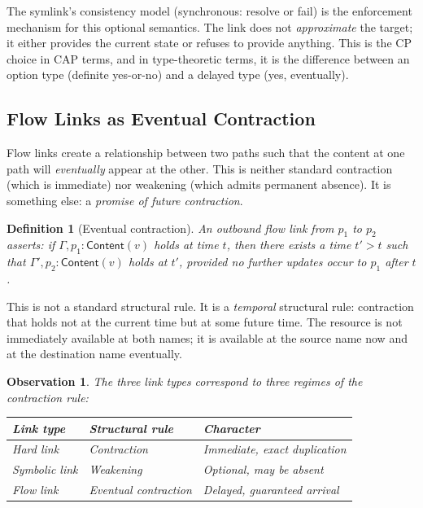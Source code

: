\documentclass[11pt]{article}
\newtheorem{definition}{Definition}
\newtheorem{observation}{Observation}
\newcommand{\tp}[1]{\mathsf{#1}}
\begin{document}
The symlink's consistency model (synchronous: resolve or fail) is the
enforcement mechanism for this optional semantics. The link does not
\emph{approximate} the target; it either provides the current state or refuses
to provide anything. This is the CP choice in CAP terms, and in type-theoretic
terms, it is the difference between an option type (definite yes-or-no) and a
delayed type (yes, eventually).

\subsection{Flow Links as Eventual Contraction}

Flow links create a relationship between two paths such that the content at one
path will \emph{eventually} appear at the other. This is neither standard
contraction (which is immediate) nor weakening (which admits permanent
absence). It is something else: a \emph{promise of future contraction}.

\begin{definition}[Eventual contraction]
An outbound flow link from $p_1$ to $p_2$ asserts: if $\Gamma, p_1 :
\tp{Content}(v)$ holds at time $t$, then there exists a time $t' > t$ such
that $\Gamma', p_2 : \tp{Content}(v)$ holds at $t'$, provided no further
updates occur to $p_1$ after $t$.
\end{definition}

This is not a standard structural rule. It is a \emph{temporal} structural
rule: contraction that holds not at the current time but at some future time.
The resource is not immediately available at both names; it is available at the
source name now and at the destination name eventually.

\begin{observation}
The three link types correspond to three regimes of the contraction rule:
\begin{center}
\begin{tabular}{lll}
\toprule
\textbf{Link type} & \textbf{Structural rule} & \textbf{Character} \\
\midrule
Hard link & Contraction & Immediate, exact duplication \\
Symbolic link & Weakening & Optional, may be absent \\
Flow link & Eventual contraction & Delayed, guaranteed arrival \\
\bottomrule
\end{tabular}
\end{center}
\end{observation}
\end{document}
